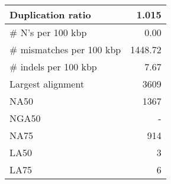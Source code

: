 \documentclass[12pt,a4paper]{article}
\begin{document}
\begin{table}[ht]
\begin{center}
\begin{tabular}{|l*{1}{|r}|}
Duplication ratio & 1.015 \\ \hline
\# N's per 100 kbp & 0.00 \\ \hline
\# mismatches per 100 kbp & 1448.72 \\ \hline
\# indels per 100 kbp & 7.67 \\ \hline
Largest alignment & 3609 \\ \hline
NA50 & 1367 \\ \hline
NGA50 & - \\ \hline
NA75 & 914 \\ \hline
LA50 & 3 \\ \hline
LA75 & 6 \\ \hline
\end{tabular}
\end{center}
\end{table}
\end{document}
